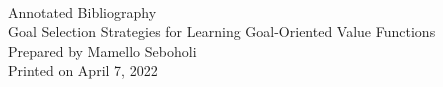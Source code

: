 \documentclass[]{report}
\begin{document}
\onecolumn
{}

\
\begin{center}
    \LARGE{Annotated Bibliography}\\[10pt]
    \LARGE Goal Selection Strategies for Learning Goal-Oriented Value Functions\\[20pt]
    \large Prepared by Mamello Seboholi\\[10pt]
    \large Printed on April 7, 2022\\
\end{center}

\nocite{*}

\begingroup
\let\clearpage\relax

\endgroup
\end{document}
